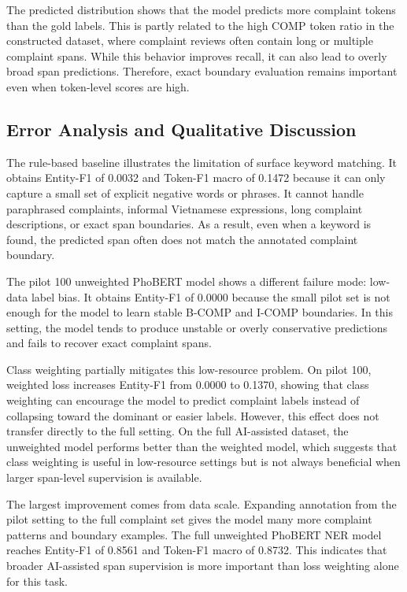 \documentclass[11pt]{article}
\begin{document}
The predicted distribution shows that the model predicts more complaint tokens than the gold labels. This is partly related to the high COMP token ratio in the constructed dataset, where complaint reviews often contain long or multiple complaint spans. While this behavior improves recall, it can also lead to overly broad span predictions. Therefore, exact boundary evaluation remains important even when token-level scores are high.

\subsection{Error Analysis and Qualitative Discussion}

The rule-based baseline illustrates the limitation of surface keyword matching. It obtains Entity-F1 of 0.0032 and Token-F1 macro of 0.1472 because it can only capture a small set of explicit negative words or phrases. It cannot handle paraphrased complaints, informal Vietnamese expressions, long complaint descriptions, or exact span boundaries. As a result, even when a keyword is found, the predicted span often does not match the annotated complaint boundary.

The pilot 100 unweighted PhoBERT model shows a different failure mode: low-data label bias. It obtains Entity-F1 of 0.0000 because the small pilot set is not enough for the model to learn stable B-COMP and I-COMP boundaries. In this setting, the model tends to produce unstable or overly conservative predictions and fails to recover exact complaint spans.

Class weighting partially mitigates this low-resource problem. On pilot 100, weighted loss increases Entity-F1 from 0.0000 to 0.1370, showing that class weighting can encourage the model to predict complaint labels instead of collapsing toward the dominant or easier labels. However, this effect does not transfer directly to the full setting. On the full AI-assisted dataset, the unweighted model performs better than the weighted model, which suggests that class weighting is useful in low-resource settings but is not always beneficial when larger span-level supervision is available.

The largest improvement comes from data scale. Expanding annotation from the pilot setting to the full complaint set gives the model many more complaint patterns and boundary examples. The full unweighted PhoBERT NER model reaches Entity-F1 of 0.8561 and Token-F1 macro of 0.8732. This indicates that broader AI-assisted span supervision is more important than loss weighting alone for this task.
\end{document}
